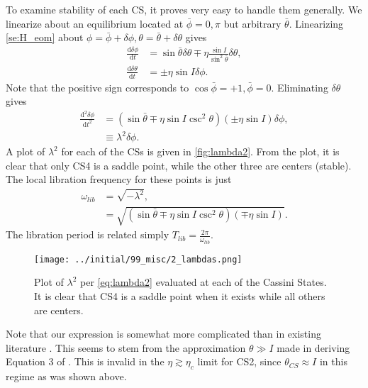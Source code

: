 \documentclass[
        fleqn,
        usenatbib,
        referee,
    ]{mnras}
\newcommand*{\rd}[2]{\frac{\mathrm{d}#1}{\mathrm{d}#2}}
\newcommand*{\rtd}[2]{\frac{\mathrm{d}^2#1}{\mathrm{d}#2^2}}
\newcommand*{\p}[1]{\left(#1\right)}
\begin{document}
To examine stability of each CS, it proves very easy to handle them generally.
We linearize about an equilibrium located at $\bar{\phi} = 0, \pi$ but arbitrary
$\bar{\theta}$. Linearizing \autoref{se:H_eom} about $\phi = \bar{\phi} + \delta
\phi, \theta = \bar{\theta} + \delta \theta$ gives
\begin{subequations}\label{se:H_eom_lin}
    \begin{align}
        \rd{\delta \phi}{t} &= \sin \bar{\theta} \delta \theta
            \mp \eta \frac{\sin I}{\sin^2\bar{\theta}} \delta \theta,\\
        \rd{\delta \theta}{t} &= \pm \eta \sin I \delta \phi.
    \end{align}
\end{subequations}
Note that the positive sign corresponds to $\cos \bar{\phi} = +1, \bar{\phi} =
0$. Eliminating $\delta \theta$ gives
\begin{align}
    \rtd{\delta \phi}{t} &= \p{\sin \bar{\theta}
        \mp \eta \sin I\csc^2\theta}\p{\pm \eta \sin I} \delta
            \phi,\\
        &\equiv \lambda^2\delta \phi.\label{eq:lambda2}
\end{align}
A plot of $\lambda^2$ for each of the CSs is given in \autoref{fig:lambda2}.
From the plot, it is clear that only CS4 is a saddle point, while the other
three are centers (stable). The local libration frequency for these points is
just
\begin{align}
    \omega_{lib} &= \sqrt{-\lambda^2},\\
        &= \sqrt{\p{\sin \bar{\theta}
            \mp \eta \sin I \csc^2\theta}\p{\mp \eta \sin I}}.
\end{align}
The libration period is related simply $T_{lib} = \frac{2\pi}{\omega_{lib}}$.
\begin{figure}[t]
    \centering
    \texttt{[image: ../initial/99\_misc/2\_lambdas.png]}
    \caption{Plot of $\lambda^2$ per \autoref{eq:lambda2} evaluated at each
    of the Cassini States. It is clear that CS4 is a saddle point when it
    exists while all others are centers.}\label{fig:lambda2}
\end{figure}

Note that our expression is somewhat more complicated than in existing
literature \citep{millholland_disk,ward2004II}. This seems to stem from the
approximation $\theta \gg I$ made in deriving Equation 3 of
\citet{ward2004II}. This is invalid in the $\eta \gtrsim \eta_c$ limit for
CS2, since $\theta_{CS} \approx I$ in this regime as was shown above.
\end{document}
